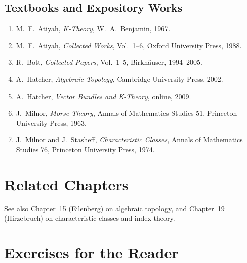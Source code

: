 \subsection*{Textbooks and Expository Works}
\begin{enumerate}
    \item M.\ F.\ Atiyah, \textit{K-Theory}, W.\ A.\ Benjamin, 1967.
    \item M.\ F.\ Atiyah, \textit{Collected Works}, Vol.\ 1--6, Oxford University Press, 1988.
    \item R.\ Bott, \textit{Collected Papers}, Vol.\ 1--5, Birkh\"auser, 1994--2005.
    \item A.\ Hatcher, \textit{Algebraic Topology}, Cambridge University Press, 2002.
    \item A.\ Hatcher, \textit{Vector Bundles and K-Theory}, online, 2009.
    \item J.\ Milnor, \textit{Morse Theory}, Annals of Mathematics Studies 51, Princeton University Press, 1963.
    \item J.\ Milnor and J.\ Stasheff, \textit{Characteristic Classes}, Annals of Mathematics Studies 76, Princeton University Press, 1974.
\end{enumerate}

\section{Related Chapters}
See also Chapter~15 (Eilenberg) on algebraic topology, and Chapter~19 (Hirzebruch) on characteristic classes and index theory.

\section*{Exercises for the Reader}

